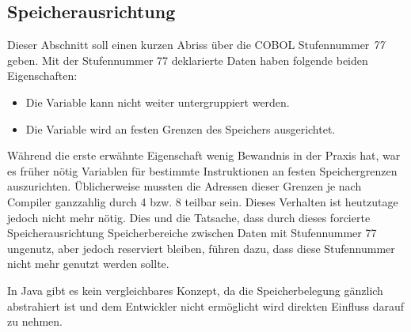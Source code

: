 \subsection{Speicherausrichtung}
Dieser Abschnitt soll einen kurzen Abriss über die COBOL Stufennummer \textit{77} geben. Mit der Stufennummer 77 deklarierte Daten haben folgende beiden Eigenschaften:

\begin{itemize}
    \item Die Variable kann nicht weiter untergruppiert werden.
    \item Die Variable wird an festen Grenzen des Speichers ausgerichtet.
\end{itemize}

Während die erste erwähnte Eigenschaft wenig Bewandnis in der Praxis hat, war es früher nötig Variablen für bestimmte Instruktionen an festen Speichergrenzen auszurichten. Üblicherweise mussten die Adressen dieser Grenzen je nach Compiler ganzzahlig durch 4 bzw. 8 teilbar sein. Dieses Verhalten ist heutzutage jedoch nicht mehr nötig. Dies und die Tatsache, dass durch dieses forcierte Speicherausrichtung Speicherbereiche zwischen Daten mit Stufennummer 77 ungenutz, aber jedoch reserviert bleiben, führen dazu, dass diese Stufennummer nicht mehr genutzt werden sollte.

In Java gibt es kein vergleichbares Konzept, da die Speicherbelegung gänzlich abstrahiert ist und dem Entwickler nicht ermöglicht wird direkten Einfluss darauf zu nehmen.